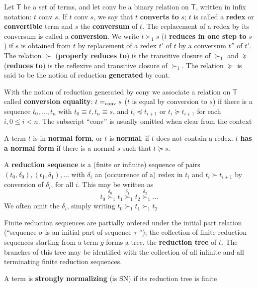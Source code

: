 \documentclass[11pt]{article}
\begin{document}
\begin{definition}
Let \(\mathsf{T}\) be a set of terms, and let conv be a binary relation on
\(\mathsf{T}\), written in infix notation: \(t\) conv \(s\). If \(t\) conv \(s\), we
say that \(t\) \textbf{converts to} \(s\); \(t\) is called a \textbf{redex} or
\textbf{convertible} term and \(s\) the \textbf{conversum} of \(t\). The replacement of a
redex by its conversum is called a \textbf{conversion}. We write \(t\succ_1 s\)
(\(t\) \textbf{reduces in one step to} \(s\)) if \(s\) is obtained from \(t\) by
replacement of a redex \(t'\) of \(t\) by a conversum \(t''\) of \(t'\). The relation
\(\succ\) (\textbf{properly reduces to}) is the transitive closure of \(\succ_1\) and
\(\succeq\) (\textbf{reduces to}) is the reflexive and transitive closure of
\(\succ_1\). The relation \(\succeq\) is said to be the notion of reduction
\textbf{generated} by cont.

With the notion of reduction generated by cony we associate a relation on
\(\mathsf{T}\) called \textbf{conversion equality}: \(t=_{\text{conv}}s\) (\(t\) is equal by
conversion to \(s\)) if there 
is a sequence \(t_0,\dots,t_n\) with \(t_0\equiv t,t_n\equiv s\), and \(t_i\preceq
   t_{i+1}\) or \(t_i\succeq t_{i+1}\) for each
\(i, 0\le i < n\). The subscript ``conv'' is usually omitted when clear from the
context

A term \(t\) is in \textbf{normal form}, or \(t\) is \textbf{normal}, if \(t\) does not contain a redex. \(t\)
\textbf{has a normal form} if there is a normal \(s\) such that \(t\succeq s\).

A \textbf{reduction sequence} is a (finite or infinite) sequence of pairs
\((t_0,\delta_0),(t_1,\delta_1),\dots\) 
with \(\delta_i\) an (occurrence of a) redex in \(t_i\) and \(t_i\succ t_{i+1}\) by
conversion 
of \(\delta_i\), for all \(i\). This may be written as
\begin{equation*}
t_0\overset{\delta_0}{\succ}_1 t_1\overset{\delta_1}{\succ}_1 t_2
\overset{\delta_2}{\succ}_1\dots
\end{equation*}
We often omit the \(\delta_i\), simply writing \(t_0\succ_1 t_1\succ_1 t_2\)

Finite reduction sequences are partially ordered under the initial part
relation (``sequence \(\sigma\) is an initial part of sequence \(\tau\) ''); the collection of
finite
reduction sequences starting from a term \(g\) forms a tree, the \textbf{reduction tree}
of \(t\). The branches of this tree may be identified with the collection of all
infinite and all terminating finite reduction sequences.


A term is \textbf{strongly normalizing} (is SN) if its reduction tree is finite
\end{definition}
\end{document}
